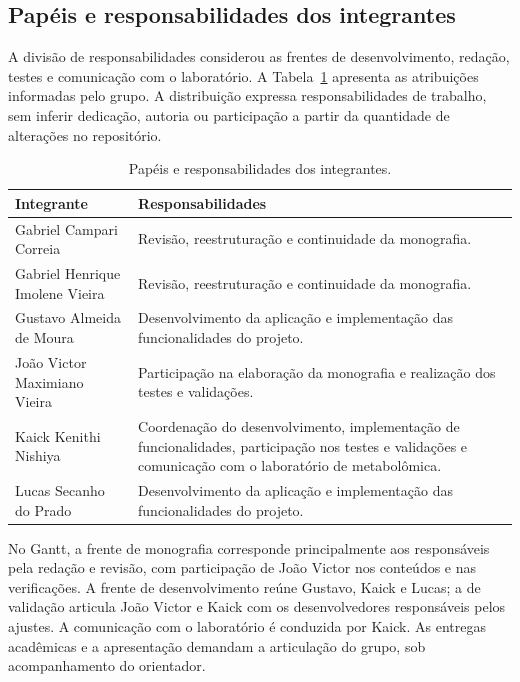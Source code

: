 \subsection{Papéis e responsabilidades dos integrantes}

A divisão de responsabilidades considerou as frentes de desenvolvimento, redação, testes e comunicação com o laboratório. A Tabela~\ref{tab:4-responsabilidades} apresenta as atribuições informadas pelo grupo. A distribuição expressa responsabilidades de trabalho, sem inferir dedicação, autoria ou participação a partir da quantidade de alterações no repositório.

\begin{table}[htbp]
\centering
\caption{Papéis e responsabilidades dos integrantes.}
\label{tab:4-responsabilidades}
\small
\begin{tabularx}{\textwidth}{|p{}|X|}
\hline
\textbf{Integrante} & \textbf{Responsabilidades} \\ \hline
Gabriel Campari Correia & Revisão, reestruturação e continuidade da monografia. \\ \hline
Gabriel Henrique Imolene Vieira & Revisão, reestruturação e continuidade da monografia. \\ \hline
Gustavo Almeida de Moura & Desenvolvimento da aplicação e implementação das funcionalidades do projeto. \\ \hline
João Victor Maximiano Vieira & Participação na elaboração da monografia e realização dos testes e validações. \\ \hline
Kaick Kenithi Nishiya & Coordenação do desenvolvimento, implementação de funcionalidades, participação nos testes e validações e comunicação com o laboratório de metabolômica. \\ \hline
Lucas Secanho do Prado & Desenvolvimento da aplicação e implementação das funcionalidades do projeto. \\ \hline
\end{tabularx}
\par{}
\end{table}

No Gantt, a frente de monografia corresponde principalmente aos responsáveis pela redação e revisão, com participação de João Victor nos conteúdos e nas verificações. A frente de desenvolvimento reúne Gustavo, Kaick e Lucas; a de validação articula João Victor e Kaick com os desenvolvedores responsáveis pelos ajustes. A comunicação com o laboratório é conduzida por Kaick. As entregas acadêmicas e a apresentação demandam a articulação do grupo, sob acompanhamento do orientador.

